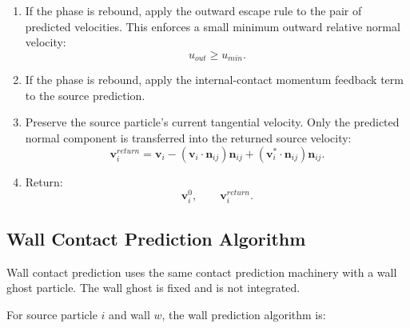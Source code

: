 \begin{enumerate}
    \item If the phase is rebound, apply the outward escape rule to the pair of
    predicted velocities. This enforces a small minimum outward relative normal
    velocity:
    \[
        u_{out} \ge u_{min}.
    \]

    \item If the phase is rebound, apply the internal-contact momentum feedback
    term to the source prediction.

    \item Preserve the source particle's current tangential velocity. Only the
    predicted normal component is transferred into the returned source
    velocity:
    \[
        \mathbf{v}_{i}^{return}
        =
        \mathbf{v}_i
        -
        \left(
            \mathbf{v}_i \cdot \mathbf{n}_{ij}
        \right)
        \mathbf{n}_{ij}
        +
        \left(
            \mathbf{v}_{i}^{\ast} \cdot \mathbf{n}_{ij}
        \right)
        \mathbf{n}_{ij}.
    \]

    \item Return:
    \[
        \mathbf{v}_{i}^{0},
        \qquad
        \mathbf{v}_{i}^{return}.
    \]
\end{enumerate}

\subsection{Wall Contact Prediction Algorithm}

Wall contact prediction uses the same contact prediction machinery with a wall
ghost particle. The wall ghost is fixed and is not integrated.

For source particle \(i\) and wall \(w\), the wall prediction algorithm is:

